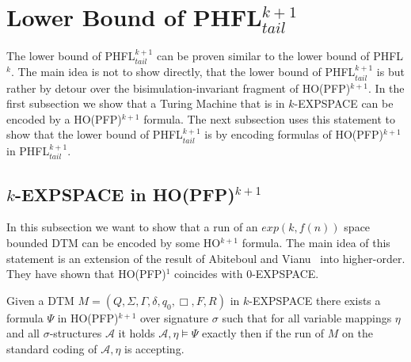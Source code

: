 
\section{Lower Bound of PHFL$^{k + 1}_{tail}$}\label{sec:lowerBoundOfPhflTail}

The lower bound of PHFL$^{k+1}_{tail}$ can be proven similar to the lower bound of PHFL$^k$. The main idea is not to
show directly, that the lower bound of PHFL$^{k+1}_{tail}$ is  but rather by detour over the
bisimulation-invariant fragment of HO(PFP)$^{k+1}$. In the first subsection we show that a Turing Machine that is in
$k$-EXPSPACE can be encoded by a HO(PFP)$^{k+1}$ formula. The next subsection uses this statement to show that the
lower bound of PHFL$^{k+1}_{tail}$ is  by encoding formulas of HO(PFP)$^{k+1}$ in PHFL$^{k+1}_{tail}$.

\subsection{$k$-EXPSPACE in HO(PFP)$^{k+1}$}\label{subsec:kExpspaceInHopfp}

In this subsection we want to show that a run of an $exp(k, f(n))$ space bounded DTM can be encoded by some
HO$^{k+1}$ formula. The main idea of this statement is an extension of the result of Abiteboul and
Vianu~\cite{abiteboul1995computing} into higher-order. They have shown that HO(PFP)$^1$ coincides with $0$-EXPSPACE.


\begin{lemma}
    \label{lemma:expspace_in_ho_pfp}
    Given a DTM $M = (Q, \Sigma, \Gamma, \delta, q_0, \Box, F, R)$ in $k$-EXPSPACE there exists a formula $\Psi$ in HO(PFP)$^{k+1}$ over signature $\sigma$ such that for all variable mappings $\eta$ and all $\sigma$-structures $\mathcal{A}$ it holds $\mathcal{A}, \eta \models \Psi$ exactly then if the run of $M$ on the standard coding of $\mathcal{A}, \eta$ is accepting.
\end{lemma}

